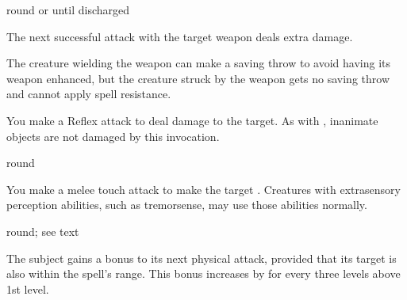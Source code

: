  round or until discharged
\begin{spelleffect}
    The next successful attack with the target weapon deals extra damage.
\end{spelleffect}
\begin{spellnotes} 
    The creature wielding the weapon can make a saving throw to avoid having its weapon enhanced, but the creature struck by the weapon gets no saving throw and cannot apply spell resistance.
\end{spellnotes}

\begin{spelleffect}
    You make a Reflex attack to deal damage to the target. As with , inanimate objects are not damaged by this invocation.
\end{spelleffect}

 round
\begin{spelleffect}
    You make a melee touch attack to make the target \blinded. Creatures with extrasensory perception abilities, such as tremorsense, may use those abilities normally.
\end{spelleffect}

 round; see text
\begin{spelleffect}
    The subject gains a  bonus to its next physical attack, provided that its target is also within the spell's range. This bonus increases by  for every three levels above 1st level.
\end{spelleffect}

